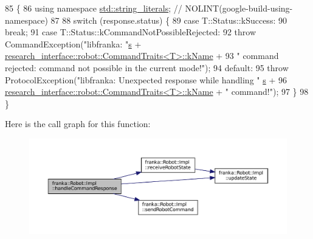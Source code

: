 \begin{DoxyCode}
85                                                 \{
86     \textcolor{keyword}{using namespace }\hyperlink{namespacestd_1_1string__literals}{std::string\_literals};  \textcolor{comment}{// NOLINT(google-build-using-namespace)}
87 
88     \textcolor{keywordflow}{switch} (response.status) \{
89       \textcolor{keywordflow}{case} T::Status::kSuccess:
90         \textcolor{keywordflow}{break};
91       \textcolor{keywordflow}{case} T::Status::kCommandNotPossibleRejected:
92         \textcolor{keywordflow}{throw} CommandException(\textcolor{stringliteral}{"libfranka: "}\hyperlink{namespaceservice__node__3_aa976421a49e0b54f23833423400849ae}{s} + 
      \hyperlink{structresearch__interface_1_1robot_1_1CommandTraits}{research\_interface::robot::CommandTraits<T>::kName} +
93                                \textcolor{stringliteral}{" command rejected: command not possible in the current mode!"});
94       \textcolor{keywordflow}{default}:
95         \textcolor{keywordflow}{throw} ProtocolException(\textcolor{stringliteral}{"libfranka: Unexpected response while handling "}
      \hyperlink{namespaceservice__node__3_aa976421a49e0b54f23833423400849ae}{s} +
96                                 
      \hyperlink{structresearch__interface_1_1robot_1_1CommandTraits}{research\_interface::robot::CommandTraits<T>::kName} + \textcolor{stringliteral}{"
       command!"});
97     \}
98   \}
\end{DoxyCode}
Here is the call graph for this function\+:
\nopagebreak
\begin{figure}[H]
\begin{center}
\leavevmode
\includegraphics[width=350pt]{classfranka_1_1Robot_1_1Impl_a939a959d9bb69ad7567d7d3a2aabea3e_cgraph}
\end{center}
\end{figure}
\mbox{\label{classfranka_1_1Robot_1_1Impl_af562b87b6d5d8f7ce271daaa82b88693}} 
